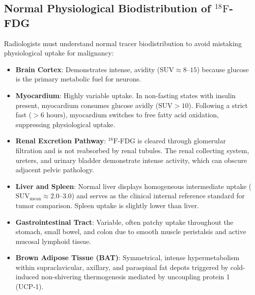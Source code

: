 \documentclass[11pt,a4paper]{article}
\begin{document}
\subsection{Normal Physiological Biodistribution of $^{18}\text{F}$-FDG}
Radiologists must understand normal tracer biodistribution to avoid mistaking physiological uptake for malignancy:
\begin{itemize}[leftmargin=*]
    \item \textbf{Brain Cortex}: Demonstrates intense, avidity ($\text{SUV} \approx 8\text{--}15$) because glucose is the primary metabolic fuel for neurons.
    \item \textbf{Myocardium}: Highly variable uptake. In non-fasting states with insulin present, myocardium consumes glucose avidly ($\text{SUV} > 10$). Following a strict fast ($>6\text{ hours}$), myocardium switches to free fatty acid oxidation, suppressing physiological uptake.
    \item \textbf{Renal Excretion Pathway}: $^{18}\text{F}$-FDG is cleared through glomerular filtration and is not reabsorbed by renal tubules. The renal collecting system, ureters, and urinary bladder demonstrate intense activity, which can obscure adjacent pelvic pathology.
    \item \textbf{Liver and Spleen}: Normal liver displays homogeneous intermediate uptake ($\text{SUV}_{\text{mean}} \approx 2.0\text{--}3.0$) and serves as the clinical internal reference standard for tumor comparison. Spleen uptake is slightly lower than liver.
    \item \textbf{Gastrointestinal Tract}: Variable, often patchy uptake throughout the stomach, small bowel, and colon due to smooth muscle peristalsis and active mucosal lymphoid tissue.
    \item \textbf{Brown Adipose Tissue (BAT)}: Symmetrical, intense hypermetabolism within supraclavicular, axillary, and paraspinal fat depots triggered by cold-induced non-shivering thermogenesis mediated by uncoupling protein 1 (UCP-1).
\end{itemize}
\end{document}
